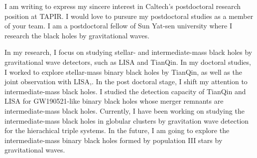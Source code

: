\documentclass[11pt,a4paper,sans]{letter} %
\date{}
\begin{document}










 
I am writing to express my sincere interest in Caltech's postdoctoral research position at TAPIR. I would love to
    pursure my postdoctoral studies as a member of your team. I am a postdoctoral fellow of Sun Yat-sen university where
    I research the black holes by gravitational waves.

In my research, I focus on studying stellar- and intermediate-mass black holes by gravitational wave detectors, such
    as LISA and TianQin. In my doctoral studies, I worked to explore stellar-mass
    binary black holes by TianQin, as well as the joint observation with LISA,. In the post doctoral stage, I shift my
    attention to intermediate-mass black holes. I studied the detection capacity of TianQin and LISA for
    GW190521-like binary black holes whose merger remnants are intermediate-mass black holes. Currently, I have been
    working on studying the intermediate-mass black holes in globular clusters by gravitation wave detection for the
    hierachical triple systems. In the future, I am going to explore the intermediate-mass binary black holes formed by
    population III stars by gravitational waves.
\end{document}
